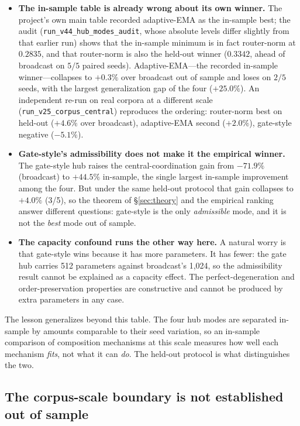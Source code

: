 \documentclass[10pt]{article}
\theoremstyle{definition}
\theoremstyle{plain}
\theoremstyle{remark}
\begin{document}
\begin{itemize}[leftmargin=1.4em, itemsep=2pt]
    \item \textbf{The in-sample table is already wrong about its own winner.} The project's own main table recorded adaptive-EMA as the in-sample best; the audit (\texttt{run\_v44\_hub\_modes\_audit}, whose absolute levels differ slightly from that earlier run) shows that the in-sample minimum is in fact router-norm at $0.2835$, and that router-norm is also the held-out winner ($0.3342$, ahead of broadcast on $5/5$ paired seeds). Adaptive-EMA---the recorded in-sample winner---collapses to $+0.3\%$ over broadcast out of sample and loses on $2/5$ seeds, with the largest generalization gap of the four ($+25.0\%$). An independent re-run on real corpora at a different scale (\texttt{run\_v25\_corpus\_central}) reproduces the ordering: router-norm best on held-out ($+4.6\%$ over broadcast), adaptive-EMA second ($+2.0\%$), gate-style negative ($-5.1\%$).
    \item \textbf{Gate-style's admissibility does not make it the empirical winner.} The gate-style hub raises the central-coordination gain from $-71.9\%$ (broadcast) to $+44.5\%$ in-sample, the single largest in-sample improvement among the four. But under the same held-out protocol that gain collapses to $+4.0\%$ (3/5), so the theorem of \S\ref{sec:theory} and the empirical ranking answer different questions: gate-style is the only \emph{admissible} mode, and it is not the \emph{best} mode out of sample.
    \item \textbf{The capacity confound runs the other way here.} A natural worry is that gate-style wins because it has more parameters. It has fewer: the gate hub carries 512 parameters against broadcast's 1{,}024, so the admissibility result cannot be explained as a capacity effect. The perfect-degeneration and order-preservation properties are constructive and cannot be produced by extra parameters in any case.
\end{itemize}

The lesson generalizes beyond this table. The four hub modes are separated in-sample by amounts comparable to their seed variation, so an in-sample comparison of composition mechanisms at this scale measures how well each mechanism \emph{fits}, not what it can \emph{do}. The held-out protocol is what distinguishes the two.

\subsection{The corpus-scale boundary is not established out of sample}
\label{sec:corpus}
\end{document}
